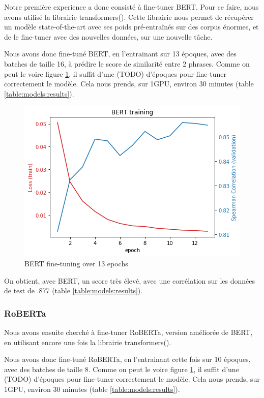 \documentclass[11pt,a4paper, french]{article}
\begin{document}
Notre première experience a donc consisté à fine-tuner BERT. Pour ce faire, nous avons utilisé la librairie transformers(\cite{huggingface}). Cette librairie nous permet de récupérer un modèle state-of-the-art avec ses poids pré-entraînés sur des corpus énormes, et de le fine-tuner avec des nouvelles données, sur une nouvelle tâche.

Nous avons donc fine-tuné BERT, en l'entrainant sur 13 époques, avec des batches de taille 16, à prédire le score de similarité entre 2 phrases. Comme on peut le voire figure \ref{fig:bert:finetunning}, il suffit d'une (TODO) d'époques pour fine-tuner correctement le modèle. Cela nous prends, sur 1GPU, environ 30 minutes (table \ref{table:models:results}).

\begin{figure}
  \includegraphics[width=\linewidth]{resources/bert-training.png}
  \caption{BERT fine-tuning over 13 epochs}
  \label{fig:bert:finetunning}
\end{figure}

On obtient, avec BERT, un score très élevé, avec une corrélation sur les données de test de .877 (table \ref{table:models:results}).

%
\subsubsection{RoBERTa}

Nous avons ensuite cherché à fine-tuner RoBERTa, version améliorée de BERT, en utilisant encore une fois la librairie transformers(\cite{huggingface}).

Nous avons donc fine-tuné RoBERTa, en l'entrainant cette fois sur 10 époques, avec des batches de taille 8. Comme on peut le voire figure \ref{fig:bert:finetunning}, il suffit d'une (TODO) d'époques pour fine-tuner correctement le modèle. Cela nous prends, sur 1GPU, environ 30 minutes (table \ref{table:models:results}).
\end{document}
